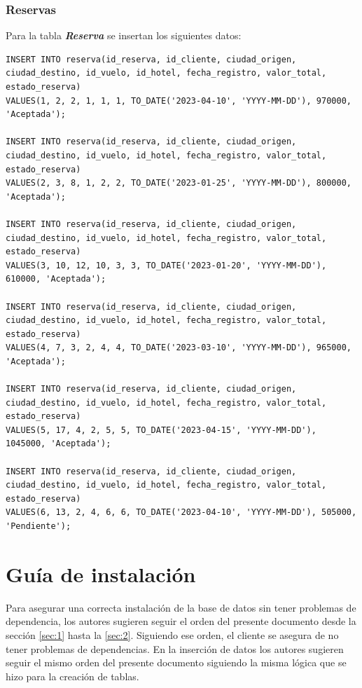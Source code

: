 \documentclass{article}
\begin{document}
\subsubsection{Reservas}

Para la tabla \textit{\textbf{Reserva}} se insertan los siguientes datos:

\begin{lstlisting}
INSERT INTO reserva(id_reserva, id_cliente, ciudad_origen, ciudad_destino, id_vuelo, id_hotel, fecha_registro, valor_total, estado_reserva)
VALUES(1, 2, 2, 1, 1, 1, TO_DATE('2023-04-10', 'YYYY-MM-DD'), 970000, 'Aceptada');

INSERT INTO reserva(id_reserva, id_cliente, ciudad_origen, ciudad_destino, id_vuelo, id_hotel, fecha_registro, valor_total, estado_reserva)
VALUES(2, 3, 8, 1, 2, 2, TO_DATE('2023-01-25', 'YYYY-MM-DD'), 800000, 'Aceptada');

INSERT INTO reserva(id_reserva, id_cliente, ciudad_origen, ciudad_destino, id_vuelo, id_hotel, fecha_registro, valor_total, estado_reserva)
VALUES(3, 10, 12, 10, 3, 3, TO_DATE('2023-01-20', 'YYYY-MM-DD'), 610000, 'Aceptada');

INSERT INTO reserva(id_reserva, id_cliente, ciudad_origen, ciudad_destino, id_vuelo, id_hotel, fecha_registro, valor_total, estado_reserva)
VALUES(4, 7, 3, 2, 4, 4, TO_DATE('2023-03-10', 'YYYY-MM-DD'), 965000, 'Aceptada');

INSERT INTO reserva(id_reserva, id_cliente, ciudad_origen, ciudad_destino, id_vuelo, id_hotel, fecha_registro, valor_total, estado_reserva)
VALUES(5, 17, 4, 2, 5, 5, TO_DATE('2023-04-15', 'YYYY-MM-DD'), 1045000, 'Aceptada');

INSERT INTO reserva(id_reserva, id_cliente, ciudad_origen, ciudad_destino, id_vuelo, id_hotel, fecha_registro, valor_total, estado_reserva)
VALUES(6, 13, 2, 4, 6, 6, TO_DATE('2023-04-10', 'YYYY-MM-DD'), 505000, 'Pendiente');
\end{lstlisting}

\newpage
\section{Guía de instalación}
Para asegurar una correcta instalación de la base de datos sin tener problemas de dependencia, los autores sugieren seguir el orden del presente documento desde la sección \ref{sec:1} hasta la \ref{sec:2}. Siguiendo ese orden, el cliente se asegura de no tener problemas de dependencias. En la inserción de datos los autores sugieren seguir el mismo orden del presente documento siguiendo la misma lógica que se hizo para la creación de tablas.
\end{document}
